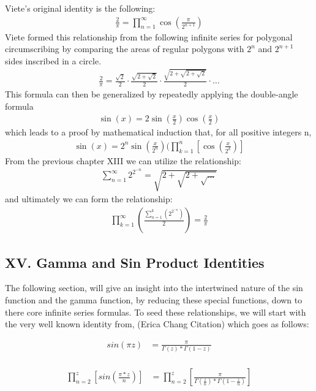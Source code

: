 \documentclass{article}
\begin{document}
Viete's original identity is the following:
\begin{align*}
\frac{2}{\pi} = \prod_{n=1}^{\infty} \cos\left(\frac{\pi}{2^{n+1}}\right)
\end{align*}
Viete formed this relationship from the following infinite series for polygonal circumscribing by comparing the areas of regular polygons with $2^{n}$ and $2^{n+1}$ sides inscribed in a circle.
\begin{align*}
\frac{2}{\pi} = \frac{\sqrt{2}}{2} \cdot \frac{\sqrt{2+\sqrt{2}}}{2} \cdot \frac{\sqrt{2+\sqrt{2+\sqrt{2}}}}{2} \cdot \ldots
\end{align*}
This formula can then be generalized by repeatedly applying the double-angle formula
\begin{align*}
\sin(x) = 2\sin(\frac{x}{2})\cos(\frac{x}{2})
\end{align*}
which leads to a proof by mathematical induction that, for all positive integers n,
\begin{align*}
\sin(x) = 2^{n}\sin(\frac{x}{2^{n}})(\prod_{k=1}^{n} [\cos(\frac{x}{2^{k}})]
\end{align*}
From the previous chapter XIII we can utilize the relationship:
\begin{align*}
\sum_{n=1}^{\infty} 2^{2^{-n}} = \sqrt{2 + \sqrt{2 + \sqrt{\ldots}}}
\end{align*}
and ultimately we can form the relationship:
\begin{align*}
\prod_{k=1}^{\infty} (\frac{\sum_{n=1}^{k} (2^{2^{-n}})}{2}) = \frac{2}{\pi}
\end{align*}

\newpage
\subsection*{XV. Gamma and Sin Product Identities}
The following section, will give an insight into the intertwined nature of the sin function and the gamma function, by reducing these special functions, down to there core infinite series formulas.
To seed these relationships, we will start with the very well known identity from, (Erica Chang Citation) which goes as follows:

\begin{align*}
sin(\pi z) &= \frac{\pi}{\Gamma\left(z\right) * \Gamma\left(1 - z\right)} \\
\end{align*}

\begin{align*}
\prod_{n=2}^z\left[sin(\frac{\pi * z}{n})\right] &= \prod_{n=2}^z\left[\frac{\pi}{\Gamma\left(\frac{z}{n}\right) * \Gamma\left(1 - \frac{z}{n}\right)}\right] \\
\end{align*}
\end{document}
